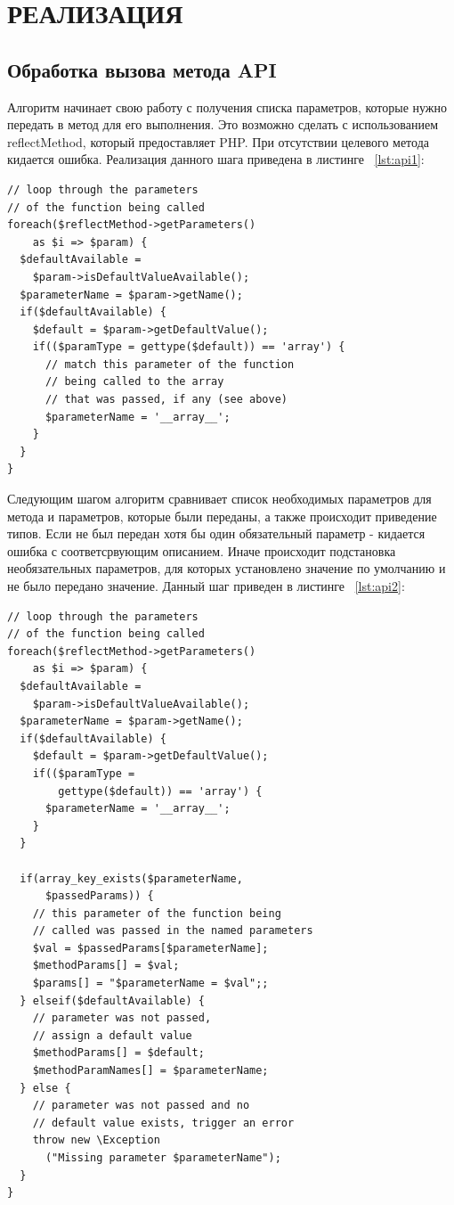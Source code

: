 \section{РЕАЛИЗАЦИЯ}


\subsection{Обработка вызова метода API}

Алгоритм начинает свою работу с получения списка параметров, которые нужно передать в метод для его выполнения. Это возможно сделать с использованием reflectMethod, который предоставляет PHP. При отсутствии целевого метода кидается ошибка. Реализация данного шага приведена в листинге ~\ref{lst:api1}:


\begin{lstlisting}[caption={Код получения списка параметров, необходимых для передачи в метод API}, label=lst:api1]
// loop through the parameters 
// of the function being called
foreach($reflectMethod->getParameters() 
    as $i => $param) {
  $defaultAvailable = 
    $param->isDefaultValueAvailable();
  $parameterName = $param->getName();
  if($defaultAvailable) {
    $default = $param->getDefaultValue();
    if(($paramType = gettype($default)) == 'array') {
      // match this parameter of the function 
      // being called to the array
      // that was passed, if any (see above)
      $parameterName = '__array__';
    }
  }
}
\end{lstlisting}

Следующим шагом алгоритм сравнивает список необходимых параметров для метода и параметров, которые были переданы, а также происходит приведение типов. Если не был передан хотя бы один обязательный параметр - кидается ошибка с соответсрвующим описанием. Иначе происходит подстановка необязательных параметров, для которых установлено значение по умолчанию и не было передано значение.
Данный шаг приведен в листинге ~\ref{lst:api2}:

\begin{lstlisting}[caption={Код сравнения типов параметров}, label=lst:api2]
// loop through the parameters 
// of the function being called
foreach($reflectMethod->getParameters() 
    as $i => $param) {
  $defaultAvailable = 
    $param->isDefaultValueAvailable();
  $parameterName = $param->getName();
  if($defaultAvailable) {
    $default = $param->getDefaultValue();
    if(($paramType = 
        gettype($default)) == 'array') {
      $parameterName = '__array__';
    }
  }

  if(array_key_exists($parameterName, 
      $passedParams)) {
    // this parameter of the function being 
    // called was passed in the named parameters
    $val = $passedParams[$parameterName];
    $methodParams[] = $val;
    $params[] = "$parameterName = $val";;
  } elseif($defaultAvailable) {
    // parameter was not passed, 
    // assign a default value
    $methodParams[] = $default;
    $methodParamNames[] = $parameterName;
  } else {
    // parameter was not passed and no 
    // default value exists, trigger an error
    throw new \Exception
      ("Missing parameter $parameterName");
  }
}
\end{lstlisting}

